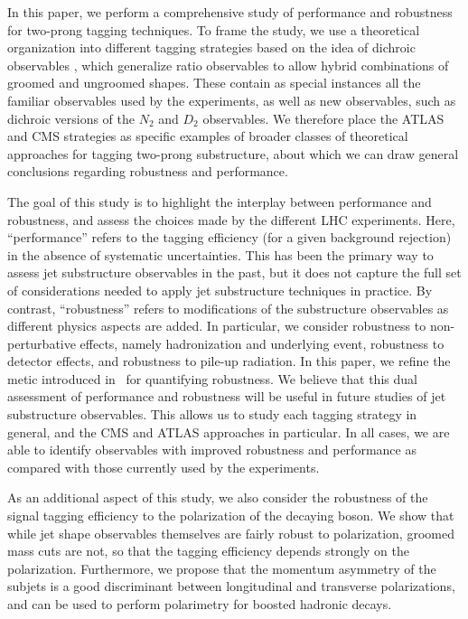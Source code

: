 \documentclass[11pt]{cernrep}
\begin{document}
In this paper, we perform a comprehensive study of performance and robustness for two-prong tagging techniques.
%
To frame the study, we use a theoretical organization into different tagging strategies based on the idea of dichroic observables \cite{Salam:2016yht}, which generalize ratio observables to allow hybrid combinations of groomed and ungroomed shapes.
 These contain as special instances all the familiar observables used by the experiments, as well as new observables, such as dichroic versions of the $N_2$ and $D_2$ observables.
 We therefore place the ATLAS and CMS strategies as specific examples of broader classes of theoretical approaches for tagging two-prong substructure, about which we can draw general conclusions regarding robustness and performance.







The goal of this study is to highlight the interplay between performance and robustness, and assess the choices made by the different LHC experiments.
%
Here, ``performance'' refers to the tagging efficiency (for a given background rejection) in the absence of systematic uncertainties.
%
This has been the primary way to assess jet substructure observables in the past, but it does not capture the full set of considerations needed to apply jet substructure techniques in practice.
%
By contrast, ``robustness'' refers to modifications of the substructure observables as different physics aspects are added.
%
In particular, we consider robustness to non-perturbative effects, namely hadronization and underlying event, robustness to detector effects, and robustness to pile-up radiation.
%
In this paper, we refine the metic introduced
in~\cite{Dasgupta:2016ktv,Salam:2016yht} for quantifying
robustness. We believe that this dual assessment of performance and
robustness will be useful in future studies of jet substructure
observables.
%
This allows us to study each tagging strategy in general, and the CMS
and ATLAS approaches in particular.
%
In all cases, we are able to identify observables with improved robustness and performance as compared with those currently used by the experiments.
%
%


As an additional aspect of this study, we also consider the robustness of the signal tagging efficiency to the polarization of the decaying boson. We show that while jet shape observables themselves are fairly robust to polarization, groomed mass cuts are not, so that the tagging efficiency depends strongly on the polarization. Furthermore, we propose that the momentum  asymmetry of the subjets is a good discriminant between longitudinal and transverse polarizations, and can be used to perform polarimetry for boosted hadronic decays. 
\end{document}
